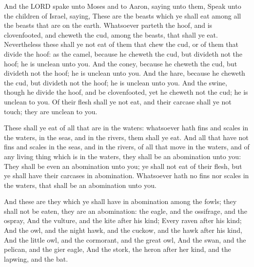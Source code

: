  And the LORD spake unto Moses and to Aaron, saying unto
them,  Speak unto the children of Israel, saying, These
are the beasts which ye shall eat among all the beasts that are on the
earth.  Whatsoever parteth the hoof, and is clovenfooted,
and cheweth the cud, among the beasts, that shall ye eat. 
Nevertheless these shall ye not eat of them that chew the cud, or of
them that divide the hoof: as the camel, because he cheweth the cud, but
divideth not the hoof; he is unclean unto you.  And the
coney, because he cheweth the cud, but divideth not the hoof; he is
unclean unto you.  And the hare, because he cheweth the
cud, but divideth not the hoof; he is unclean unto you. 
And the swine, though he divide the hoof, and be clovenfooted, yet he
cheweth not the cud; he is unclean to you.  Of their flesh
shall ye not eat, and their carcase shall ye not touch; they are unclean
to you.

 These shall ye eat of all that are in the waters:
whatsoever hath fins and scales in the waters, in the seas, and in the
rivers, them shall ye eat.  And all that have not fins
and scales in the seas, and in the rivers, of all that move in the
waters, and of any living thing which is in the waters, they shall be an
abomination unto you:  They shall be even an abomination
unto you; ye shall not eat of their flesh, but ye shall have their
carcases in abomination.  Whatsoever hath no fins nor
scales in the waters, that shall be an abomination unto you.

 And these are they which ye shall have in abomination
among the fowls; they shall not be eaten, they are an abomination: the
eagle, and the ossifrage, and the ospray,  And the
vulture, and the kite after his kind;  Every raven after
his kind;  And the owl, and the night hawk, and the
cuckow, and the hawk after his kind,  And the little owl,
and the cormorant, and the great owl,  And the swan, and
the pelican, and the gier eagle,  And the stork, the
heron after her kind, and the lapwing, and the bat.

